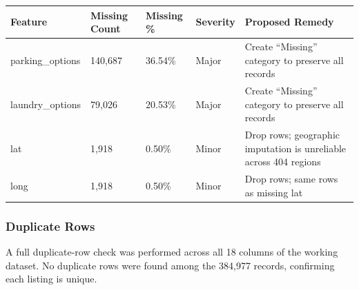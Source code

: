 \begin{table}[H]
    \centering
    \begin{tabular}{||p{3cm}|p{2.5cm}|p{2cm}|p{2.5cm}|p{4cm}||}
    \hline
    \hline
        Feature	& Missing Count & Missing \% & Severity & Proposed Remedy \\
        \hline
        \hline
        parking\_options	& 140,687	& 36.54\% & Major & Create ``Missing'' category to preserve all records \\
        \hline
        laundry\_options	& 79,026	& 20.53\% & Major & Create ``Missing'' category to preserve all records \\
        \hline
        lat	& 1,918	& 0.50\% & Minor & Drop rows; geographic imputation is unreliable across 404 regions \\
        \hline
        long	& 1,918	& 0.50\% & Minor & Drop rows; same rows as missing lat \\
        \hline
        \hline
    \end{tabular}
\end{table}

\subsubsection{Duplicate Rows}
\noindent
A full duplicate-row check was performed across all 18 columns of the working dataset. No duplicate rows were found among the 384,977 records, confirming each listing is unique.

